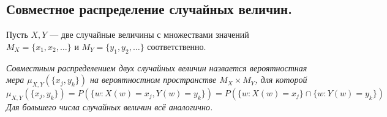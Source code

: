 \subsection{Совместное распределение случайных величин.}
Пусть $X, Y$ --- две случайные величины с множествами значений $M_X = \{x_1, x_2, \ldots\}$ и $M_Y = \{y_1, y_2, \ldots\}$
соответственно.
\begin{definition}
    \it{Совместным распределением} двух случайных величин назвается вероятностная мера $\mu_{X, Y}(\{x_j, y_k\})$
    на вероятностном пространстве $M_X \times M_Y$, для которой
    \[
        \mu_{X, Y}(\{x_j, y_k\}) = P(\{w \colon X(w) = x_j, Y(w) = y_k\}) = P(\{w \colon X(w) = x_j\} \cap \{w \colon Y(w) = y_k\})
    \]
    Для большего числа случайных величин всё аналогично.
\end{definition}

